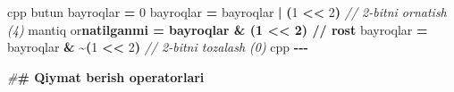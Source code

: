 \documentclass[a4paper,11pt,twoside,openright]{book}
\newenvironment{Shaded}{\begin{snugshade}}{\end{snugshade}}
\newcommand{\CharTok}[1]{\textcolor[rgb]{0.31,0.60,0.02}{#1}}
\newcommand{\CommentTok}[1]{\textcolor[rgb]{0.56,0.35,0.01}{\textit{#1}}}
\newcommand{\DecValTok}[1]{\textcolor[rgb]{0.00,0.00,0.81}{#1}}
\newcommand{\ErrorTok}[1]{\textcolor[rgb]{0.64,0.00,0.00}{\textbf{#1}}}
\newcommand{\NormalTok}[1]{#1}
\newcommand{\OperatorTok}[1]{\textcolor[rgb]{0.81,0.36,0.00}{\textbf{#1}}}
\newcommand{\PreprocessorTok}[1]{\textcolor[rgb]{0.56,0.35,0.01}{\textit{#1}}}
\begin{document}
\begin{Shaded}
\begin{Highlighting}[]
\ErrorTok{\textasciigrave{}\textasciigrave{}\textasciigrave{}}\NormalTok{cpp}
\NormalTok{butun bayroqlar }\OperatorTok{=} \DecValTok{0}
\NormalTok{bayroqlar }\OperatorTok{=}\NormalTok{ bayroqlar }\OperatorTok{|} \OperatorTok{(}\DecValTok{1} \OperatorTok{\textless{}\textless{}} \DecValTok{2}\OperatorTok{)}     \CommentTok{// 2{-}bitni o\textquotesingle{}rnatish (4)}
\NormalTok{mantiq o}\CharTok{\textquotesingle{}r}\ErrorTok{natilganmi = bayroqlar \& (1 \textless{}\textless{} 2)  // rost}
\NormalTok{bayroqlar }\OperatorTok{=}\NormalTok{ bayroqlar }\OperatorTok{\&} \OperatorTok{\textasciitilde{}(}\DecValTok{1} \OperatorTok{\textless{}\textless{}} \DecValTok{2}\OperatorTok{)}    \CommentTok{// 2{-}bitni tozalash (0)}
\ErrorTok{\textasciigrave{}\textasciigrave{}\textasciigrave{}}\NormalTok{cpp}
\OperatorTok{{-}{-}{-}}

\PreprocessorTok{\#}\ErrorTok{\# Qiymat berish operatorlari}


\end{Highlighting}
\end{Shaded}
\end{document}
